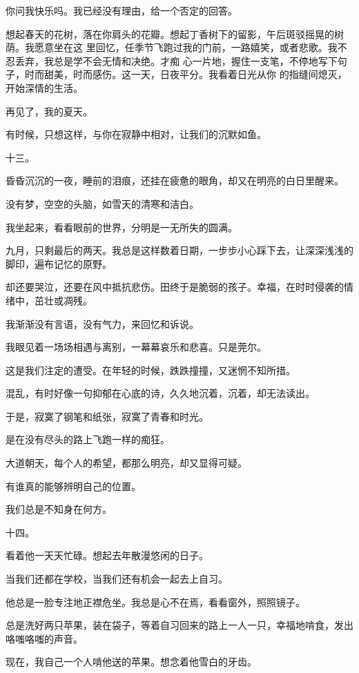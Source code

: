 \documentclass[12pt,a4paper]{article}
\def\blankrev{\vspace{1ex}}									%
\newcommand{\subpart}[1]{
	\begingroup \par
	\vspace{1ex} \centering #1
	\par \endgroup
}
\begin{document}
		你问我快乐吗。我已经没有理由，给一个否定的回答。

		想起春天的花树，落在你肩头的花瓣。想起丁香树下的留影，午后斑驳摇晃的树荫。我愿意坐在这
	里回忆，任季节飞跑过我的门前，一路嬉笑，或者悲歌。我不忍丢弃，我总是学不会无情和决绝。才痴
	心一片地，握住一支笔，不停地写下句子，时而甜美，时而感伤。这一天，日夜平分。我看着日光从你
	的指缝间熄灭，开始深情的生活。

		再见了，我的夏天。

	\endwriting



		有时候，只想这样，与你在寂静中相对，让我们的沉默如鱼。

		\subpart{十三。}

		昏昏沉沉的一夜，睡前的泪痕，还挂在疲惫的眼角，却又在明亮的白日里醒来。\par
		没有梦，空空的头脑，如雪天的清寒和洁白。\par
		我坐起来，看看眼前的世界，分明是一无所失的圆满。\par
		九月，只剩最后的两天。我总是这样数着日期，一步步小心踩下去，让深深浅浅的脚印，遍布记忆的原野。\par
		却还要哭泣，还要在风中抵抗悲伤。田终于是脆弱的孩子。幸福，在时时侵袭的情绪中，茁壮或凋残。\par
		我渐渐没有言语，没有气力，来回忆和诉说。\par
		我眼见着一场场相遇与离别，一幕幕哀乐和悲喜。只是莞尔。

		\blankrev
		这是我们注定的遭受。在年轻的时候，跌跌撞撞，又迷惘不知所措。\par
		混乱，有时好像一句抑郁在心底的诗，久久地沉着，沉着，却无法读出。\par
		于是，寂寞了钢笔和纸张，寂寞了青春和时光。\par
		是在没有尽头的路上飞跑一样的痴狂。\par
		大道朝天，每个人的希望，都那么明亮，却又显得可疑。\par
		有谁真的能够辨明自己的位置。\par
		我们总是不知身在何方。


		\subpart{十四。}

		看着他一天天忙碌。想起去年散漫悠闲的日子。\par
		当我们还都在学校，当我们还有机会一起去上自习。\par
		他总是一脸专注地正襟危坐。我总是心不在焉，看看窗外，照照镜子。\par
		总是洗好两只苹果，装在袋子，等着自习回来的路上一人一只，幸福地啃食，发出咯嗤咯嗤的声音。\par
		现在，我自己一个人啃他送的苹果。想念着他雪白的牙齿。
\end{document}
